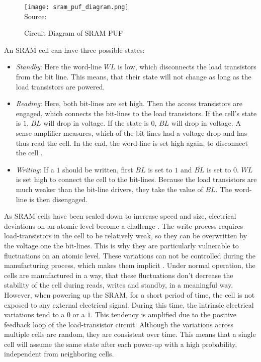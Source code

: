 \begin{figure}[H]
    \centering
    \caption{Circuit Diagram of SRAM PUF}
    \label{fig:sram_puf_circuit}
    \texttt{[image: sram\_puf\_diagram.png]}
    \\
    Source: \cite[][p. 12]{McGrath2019}
\end{figure}

An SRAM cell can have three possible states:

\begin{itemize}
    \item \emph{Standby}: Here the word-line $WL$ is low, which disconnects the load transistors from the
          bit line. This means, that their state will not change as long as the load transistors are powered. \cite[][p. 31]{Singh2013}
    \item \emph{Reading}: Here, both bit-lines are set high. Then the access transistors are engaged,
          which connects the bit-lines to the load transistors. If the cell's state is $1$, $\overline{BL}$ will
          drop in voltage. If the state is $0$, $BL$ will drop in voltage. A sense amplifier measures, which of
          the bit-lines had a voltage drop and has thus read the cell.
          In the end, the word-line is set high again, to disconnect the cell \cite[][p. 32]{Singh2013}.
    \item \emph{Writing}: If a $1$ should be written, first $BL$ is set to $1$ and $\overline{BL}$ is set to $0$.
          $WL$ is set high to connect the cell to the bit-lines. Because the load transistors are much weaker
          than the bit-line drivers, they take the value of $BL$. The word-line is then disengaged\cite[][p. 36]{Singh2013}.
\end{itemize}

As SRAM cells have been scaled down to increase speed and size,
electrical deviations on an atomic-level become a challenge \cite[][p. 658]{Bhavnagarwala2001}.
The write process requires load-transistors in the cell to be relatively weak, so they can be overwritten by the voltage
one the bit-lines. This is why they are particularly vulnerable to fluctuations on an atomic level.
These variations can not be controlled during the manufacturing process, which makes them implicit \cite[][p. 73]{Guajardo}.
Under normal operation, the cells are manufactured in a way, that these fluctuations don't decrease the stability
of the cell during reads, writes and standby, in a meaningful way.
However, when powering up the SRAM, for a short period of time, the cell is not exposed to any external
electrical signal. During this time, the intrinsic electrical variations tend to a $0$ or a $1$.
This tendency is amplified due to the positive feedback loop of the load-transistor circuit.
Although the variations across multiple cells are random, they are consistent over time.
This means that a single cell will assume the same state after each power-up with a high probability,
independent from neighboring cells. \cite[][p. 73]{Guajardo}

